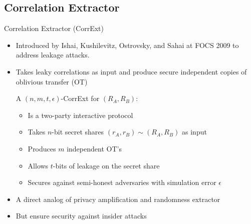 \subsection{Correlation Extractor}
\begin{frame}{Correlation Extractor (CorrExt)}
	\begin{itemize}
		\item Introduced by Ishai, Kushilevitz, Ostrovsky, and Sahai at FOCS 2009 \cite{FOCS:IKOS09} to address leakage attacks. 
		\item Takes leaky correlations as input and produce secure independent
		copies of oblivious transfer (OT)
		\pause
		\begin{definition}
			A $ (n,m,t,\epsilon) $-CorrExt for $ (R_A, R_B) $: 
			\begin{itemize}
				\item Is a two-party interactive protocol	
				\item Takes $n$-bit secret shares $ (r_A, r_B) \sim (R_A, R_B) $ as input
				\item Produces $ m $ independent OT's
				\item Allows $ t $-bits of leakage on the secret share
				\item Secures against semi-honest adversaries with simulation error $ \epsilon $
			\end{itemize}
		\end{definition}
		\pause
		\item A direct analog of privacy amplification and randomness extractor
		\item But ensure security against insider attacks
	\end{itemize}
\end{frame}
	

